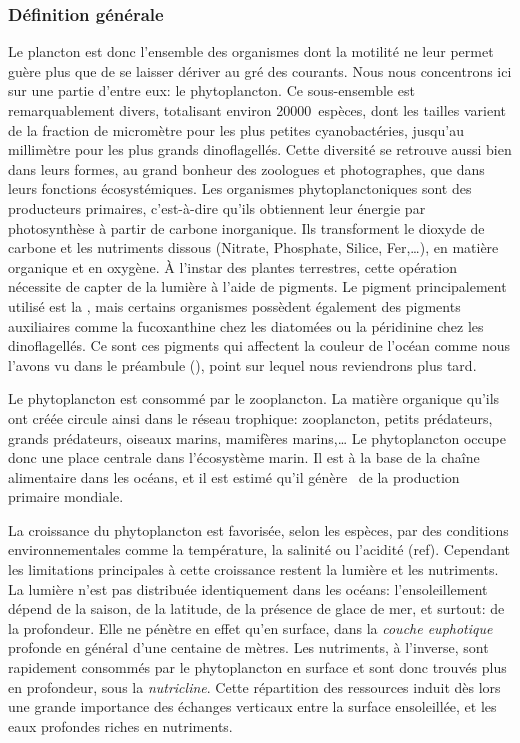 \subsubsection{Définition générale}
\label{sec:phyto-def-gen}

Le plancton est donc l'ensemble des organismes dont la motilité ne leur permet guère plus que de se laisser dériver au gré des courants.
Nous nous concentrons ici sur une partie d'entre eux: le phytoplancton.
Ce sous-ensemble est remarquablement divers, totalisant environ \num{20 000}~espèces, dont les tailles varient de la fraction de micromètre pour les plus petites cyanobactéries, jusqu'au millimètre pour les plus grands dinoflagellés.
Cette diversité se retrouve aussi bien dans leurs formes, au grand bonheur des zoologues et photographes, que dans leurs fonctions écosystémiques.
Les organismes phytoplanctoniques sont des producteurs primaires, c'est-à-dire qu'ils obtiennent leur énergie par photosynthèse à partir de carbone inorganique.
Ils transforment le dioxyde de carbone et les nutriments dissous (Nitrate, Phosphate, Silice, Fer,\dots), en matière organique et en oxygène.
À l'instar des plantes terrestres, cette opération nécessite de capter de la lumière à l'aide de pigments.
Le pigment principalement utilisé est la , mais certains organismes possèdent également des pigments auxiliaires comme la fucoxanthine chez les diatomées ou la péridinine chez les dinoflagellés.
Ce sont ces pigments qui affectent la couleur de l'océan comme nous l'avons vu dans le préambule (), point sur lequel nous reviendrons plus tard.

Le phytoplancton est consommé par le zooplancton. La matière organique qu'ils ont créée circule ainsi dans le réseau trophique: zooplancton, petits prédateurs, grands prédateurs, oiseaux marins, mamifères marins,\dots
Le phytoplancton occupe donc une place centrale dans l'écosystème marin.
Il est à la base de la chaîne alimentaire dans les océans, et il est estimé qu'il génère~ de la production primaire mondiale.

La croissance du phytoplancton est favorisée, selon les espèces, par des conditions environnementales comme la température, la salinité ou l'acidité (ref).
Cependant les limitations principales à cette croissance restent la lumière et les nutriments.
La lumière n'est pas distribuée identiquement dans les océans: l'ensoleillement dépend de la saison, de la latitude, de la présence de glace de mer, et surtout: de la profondeur.
Elle ne pénètre en effet qu'en surface, dans la \emph{couche euphotique} profonde en général d'une centaine de mètres.
Les nutriments, à l'inverse, sont rapidement consommés par le phytoplancton en surface et sont donc trouvés plus en profondeur, sous la \emph{nutricline}.
Cette répartition des ressources induit dès lors une grande importance des échanges verticaux entre la surface ensoleillée, et les eaux profondes riches en nutriments.

